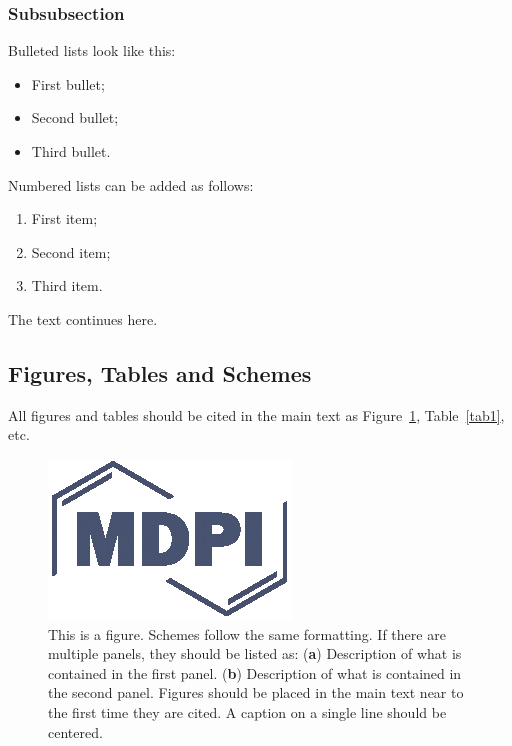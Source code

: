 \documentclass[sustainability,article,submit,pdftex,moreauthors]{Definitions/mdpi}
\begin{document}
\subsubsection{Subsubsection}

Bulleted lists look like this:
\begin{itemize}
\item	First bullet;
\item	Second bullet;
\item	Third bullet.
\end{itemize}

Numbered lists can be added as follows:
\begin{enumerate}
\item	First item; 
\item	Second item;
\item	Third item.
\end{enumerate}

The text continues here. 

\subsection{Figures, Tables and Schemes}

All figures and tables should be cited in the main text as Figure~\ref{fig1}, Table~\ref{tab1}, etc.

\begin{figure}[H]
\includegraphics[width=10.5 cm]{Definitions/logo-mdpi}
\caption{This is a figure. Schemes follow the same formatting. If there are multiple panels, they should be listed as: (\textbf{a}) Description of what is contained in the first panel. (\textbf{b}) Description of what is contained in the second panel. Figures should be placed in the main text near to the first time they are cited. A caption on a single line should be centered.\label{fig1}}
\end{figure}   
\unskip
\end{document}

